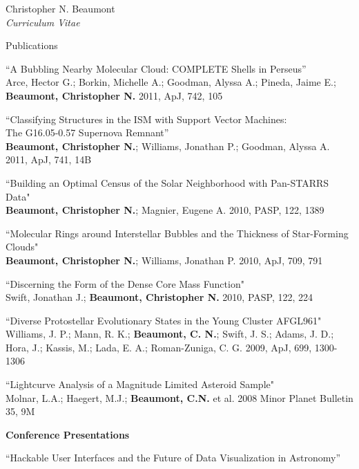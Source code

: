 \documentclass[10pt]{article}
\newenvironment{sublist}{%
	\begin{list}{}{%
		\setlength{\itemsep}{0em}\setlength{\parsep}{0em}%
		\setlength{\topsep}{0em}\setlength{\parskip}{0em}%
	}%
}%
{ \end{list} }
\begin{document}
\begin{cv}{Christopher N. Beaumont\\{\large \itshape Curriculum Vitae}}
\begin{cvlist}{Publications}
\begin{sublist}
	\item ``A Bubbling Nearby Molecular Cloud: COMPLETE Shells in Perseus'' \\
          Arce, Hector G.; Borkin, Michelle A.; Goodman, Alyssa A.; Pineda, Jaime E.; \textbf{Beaumont, Christopher N.} 2011, ApJ, 742, 105 \\
          
	\item ``Classifying Structures in the ISM with Support Vector Machines: \\The G16.05-0.57 Supernova Remnant'' \\
		\textbf{Beaumont, Christopher N.}; Williams, Jonathan P.; Goodman, Alyssa A. 2011, ApJ, 741, 14B\\
	\item ``Building an Optimal Census of the Solar Neighborhood with Pan-STARRS Data" \\
		\textbf{Beaumont, Christopher N.}; Magnier, Eugene A. 2010, PASP, 122, 1389 \\
	\item ``Molecular Rings around Interstellar Bubbles and the Thickness of Star-Forming Clouds" \\
		\textbf{Beaumont, Christopher N.}; Williams, Jonathan P. 2010, ApJ, 709, 791 \\
	\item  ``Discerning the Form of the Dense Core Mass Function" \\
		Swift, Jonathan J.; \textbf{Beaumont, Christopher N.} 2010, PASP, 122, 224 \\
	\item ``Diverse Protostellar Evolutionary States in the Young Cluster AFGL961"  \\
	Williams, J. P.; Mann, R. K.; \textbf{Beaumont, C. N.}; Swift, J. S.; Adams, J. D.; Hora, J.; Kassis, M.; Lada, E. A.; Roman-Zuniga, C. G. 2009, ApJ, 699, 1300-1306\\
	\item ``Lightcurve Analysis of a Magnitude Limited Asteroid Sample" \\
	Molnar, L.A.; Haegert, M.J.; \textbf{Beaumont, C.N.} et al. 2008 Minor Planet Bulletin 35, 9M
	\end{sublist}
	\item \textbf{Conference Presentations}\\
	\begin{sublist}
	\item ``Hackable User Interfaces and the Future of Data Visualization in Astronomy''\\

\end{sublist}
\end{cvlist}
\end{cv}
\end{document}
